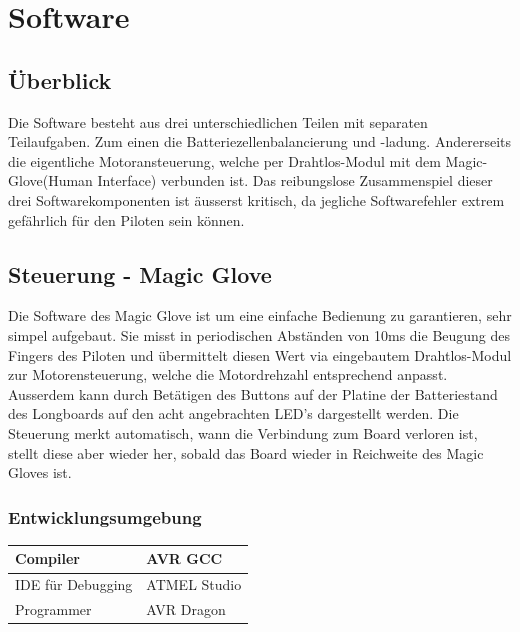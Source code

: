 \chapter{Software} \label{Software}
\section{Überblick}
Die Software besteht aus drei unterschiedlichen Teilen mit separaten Teilaufgaben. Zum einen die Batteriezellenbalancierung und -ladung. Andererseits die eigentliche Motoransteuerung, welche per Drahtlos-Modul mit dem Magic-Glove(Human Interface) verbunden ist. Das reibungslose Zusammenspiel dieser drei Softwarekomponenten ist äusserst kritisch, da jegliche Softwarefehler extrem gefährlich für den Piloten sein können.
\section{Steuerung - Magic Glove} \label{SW_MagicGlove}
Die Software des Magic Glove ist um eine einfache Bedienung zu garantieren, sehr simpel aufgebaut. Sie misst in periodischen Abständen von 10ms die Beugung des Fingers des Piloten und übermittelt diesen Wert via eingebautem Drahtlos-Modul zur Motorensteuerung, welche die Motordrehzahl entsprechend anpasst. Ausserdem kann durch Betätigen des Buttons auf der Platine der Batteriestand des Longboards auf den acht angebrachten LED's dargestellt werden. Die Steuerung merkt automatisch, wann die Verbindung zum Board verloren ist, stellt diese aber wieder her, sobald das Board wieder in Reichweite des Magic Gloves ist.\\
\subsection*{Entwicklungsumgebung}
\begin{center}
	\begin{tabular}{  l | l  }
		\hline
		Compiler & AVR GCC \\ \hline
		IDE für Debugging & ATMEL Studio \\ \hline
		Programmer & AVR Dragon \\ \hline
	\end{tabular}
\end{center}
